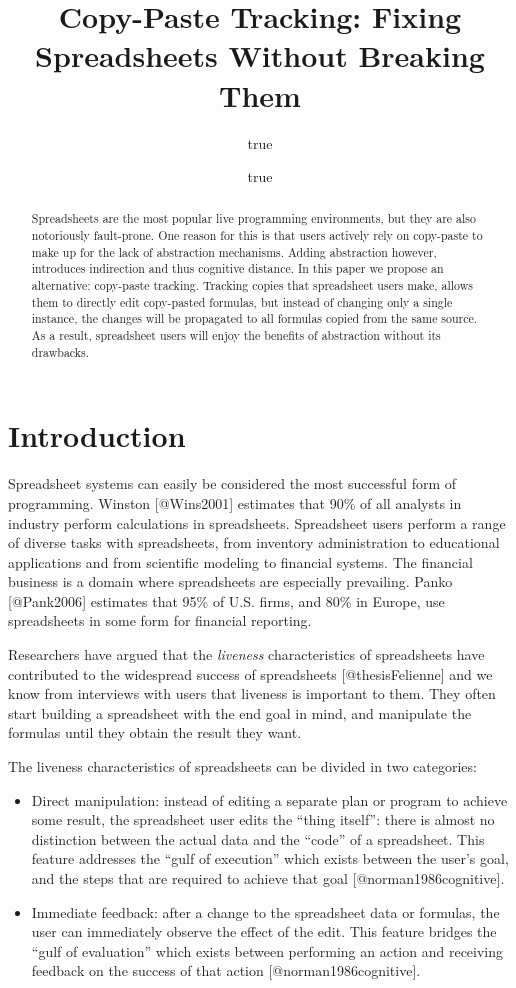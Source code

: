 \documentclass[11pt,]{article}
\title{Copy-Paste Tracking: Fixing Spreadsheets Without Breaking Them}
\author{true \and true}
\date{}
\begin{document}
\maketitle
\begin{abstract}
Spreadsheets are the most popular live programming environments, but
they are also notoriously fault-prone. One reason for this is that users
actively rely on copy-paste to make up for the lack of abstraction
mechanisms. Adding abstraction however, introduces indirection and thus
cognitive distance. In this paper we propose an alternative: copy-paste
tracking. Tracking copies that spreadsheet users make, allows them to
directly edit copy-pasted formulas, but instead of changing only a
single instance, the changes will be propagated to all formulas copied
from the same source. As a result, spreadsheet users will enjoy the
benefits of abstraction without its drawbacks.
\end{abstract}

\section{Introduction}\label{introduction}

Spreadsheet systems can easily be considered the most successful form of
programming. Winston {[}@Wins2001{]} estimates that 90\% of all analysts
in industry perform calculations in spreadsheets. Spreadsheet users
perform a range of diverse tasks with spreadsheets, from inventory
administration to educational applications and from scientific modeling
to financial systems. The financial business is a domain where
spreadsheets are especially prevailing. Panko {[}@Pank2006{]} estimates
that 95\% of U.S. firms, and 80\% in Europe, use spreadsheets in some
form for financial reporting.

Researchers have argued that the \emph{liveness} characteristics of
spreadsheets have contributed to the widespread success of spreadsheets
{[}@thesisFelienne{]} and we know from interviews with users that
liveness is important to them. They often start building a spreadsheet
with the end goal in mind, and manipulate the formulas until they obtain
the result they want.

The liveness characteristics of spreadsheets can be divided in two
categories:

\begin{itemize}
\item
  Direct manipulation: instead of editing a separate plan or program to
  achieve some result, the spreadsheet user edits the ``thing itself'':
  there is almost no distinction between the actual data and the
  ``code'' of a spreadsheet. This feature addresses the ``gulf of
  execution'' which exists between the user's goal, and the steps that
  are required to achieve that goal {[}@norman1986cognitive{]}.
\item
  Immediate feedback: after a change to the spreadsheet data or
  formulas, the user can immediately observe the effect of the edit.
  This feature bridges the ``gulf of evaluation'' which exists between
  performing an action and receiving feedback on the success of that
  action {[}@norman1986cognitive{]}.
\end{itemize}
\end{document}
